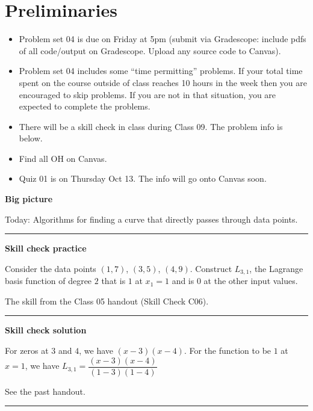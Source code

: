 \documentclass[12pt,letterpaper,noanswers]{exam}
\begin{document}
 \pdfpageheight 11in 
  \pdfpagewidth 8.5in

\noindent 

\section*{Preliminaries}

\begin{itemize}
\itemsep0pt
\item Problem set 04 is due on Friday at 5pm (submit via Gradescope: include pdfs of all code/output on Gradescope.  Upload any source code to Canvas).
\item Problem set 04 includes some ``time permitting'' problems.  If your total time spent on the course outside of class reaches 10 hours in the week then you are encouraged to skip problems.  If you are not in that situation, you are expected to complete the problems.
\item There will be a skill check in class during Class 09.  The problem info is below.
\item Find all OH on Canvas.
\item Quiz 01 is on Thursday Oct 13.  The info will go onto Canvas soon.
\end{itemize}



\noindent\textbf{Big picture}

Today: Algorithms for finding a curve that directly passes through data points.

\vspace{0.2cm}
\hrule
\vspace{0.2cm}

\noindent \textbf{Skill check practice}
\begin{questions}
\item Consider the data points $(1,7)$, $(3, 5)$, $(4, 9)$.  Construct $L_{3,1}$, the Lagrange basis function of degree $2$ that is $1$ at $x_1 = 1$ and is $0$ at the other input values.


\item The skill from the Class 05 handout (Skill Check C06).
\end{questions}


\vspace{0.2cm}
\hrule
\vspace{0.2cm}

\noindent \textbf{Skill check solution}
\begin{questions}
\item For zeros at $3$ and $4$, we have $(x-3)(x-4)$.  For the function to be $1$ at $x = 1$, we have $L_{3,1} = \dfrac{(x-3)(x-4)}{(1-3)(1-4)}$

\item See the past handout.
\end{questions}
\vspace{0.2cm}
\hrule
\vspace{0.2cm}
\end{document}

